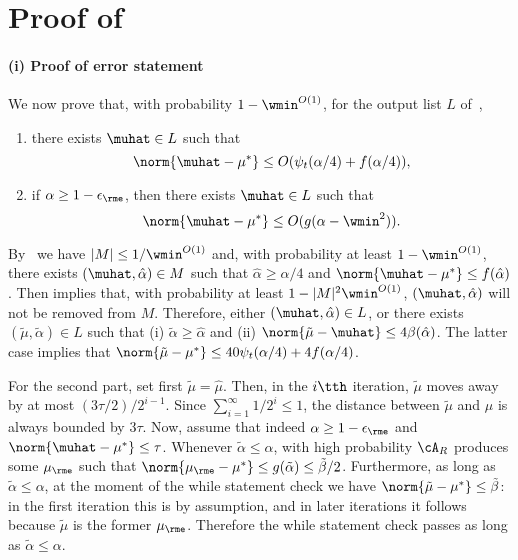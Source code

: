\section{Proof of~}
\label{sec:inner_stage_appendix}

\paragraph{(i) Proof of error statement} We now prove that, with probability \(1 - \wmin^{O(1)}\), for the output list \(L\) of~, 
\begin{enumerate}
    \item there exists \(\muhat \in L\) such that 
        \[\norm{\muhat-\mu^{\ast}} \leq O(\psi_t(\alpha/4) + f(\alpha/4)),\]
        \item if \(\alpha \geq 1-\epsilon_{\rme}\), then there exists \(\muhat \in L\) such that
        \[\norm{\muhat-\mu^{\ast}} \leq O(g(\alpha - \wmin^2)).\]
\end{enumerate}
By~ we have $|M| \leq 1/\wmin^{O(1)}$ and, with probability at least $1-\wmin^{O(1)}$, there exists \((\muhat, \hat \alpha) \in M\) such that \(\hat \alpha \geq \alpha/4\) and \(\norm{\muhat - \mu^{\ast}} \leq f(\hat\alpha)\).
Then  implies that, with probability at least $1-|M|^2\wmin^{O(1)}$, \((\muhat, \hat \alpha)\) will not be removed from \(M\).
Therefore, either \((\muhat, \hat \alpha) \in L\), or there exists \((\tilde \mu, \tilde \alpha) \in L\)
such that (i) \(\tilde \alpha \geq \hat \alpha\) and (ii) \(\norm{\tilde \mu-\muhat} \leq 4 \beta(\hat \alpha)\).
The latter case implies that \(\norm{\tilde \mu - \mu^{\ast}} \leq 40 \psi_t(\alpha/4) + 4f(\alpha/4)\).

For the second part, set first $\tilde\mu = \hat\mu$.
Then, in the $i\tth$ iteration, $\tilde\mu$ moves away by at most $(3\tau/2)/2^{i-1}$.
Since $\sum_{i=1}^\infty 1/2^{i} \leq 1$, the distance between $\tilde\mu$ and $\hat\mu$ is always bounded by $3\tau$. Now, assume that indeed $\alpha \geq 1-\epsilon_{\rme}$ and $\norm{\muhat - \mu^*} \leq \tau$. Whenever $\tilde{\alpha} \leq \alpha$, with high probability $\cA_R$ produces some $\mu_{\rme}$ such that $\norm{\mu_{\rme} - \mu^*} \leq g(\tilde\alpha) \leq \tilde{\beta}/2$.
Furthermore, as long as $\tilde\alpha \leq \alpha$, at the moment of the while statement check we have $\norm{\tilde\mu - \mu^*} \leq \tilde{\beta}$: in the first iteration this is by assumption, and in later iterations it follows because $\tilde\mu$ is the former $\mu_{\rme}$.
Therefore the while statement check passes as long as $\tilde\alpha \leq \alpha$.

